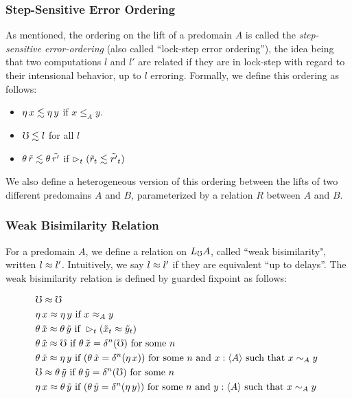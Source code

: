 \subsubsection{Step-Sensitive Error Ordering}\label{subsec:lock-step}

As mentioned, the ordering on the lift of a predomain $A$ is called the
\emph{step-sensitive error-ordering} (also called ``lock-step error ordering''),
the idea being that two computations $l$ and $l'$ are related if they are in
lock-step with regard to their intensional behavior, up to $l$ erroring.
Formally, we define this ordering as follows:

\begin{itemize}
  \item 	$\eta\, x \lesssim \eta\, y$ if $x \le_A y$.
  \item 	$\mho \lesssim l$ for all $l$ 
  \item   $\theta\, \tilde{r} \lesssim \theta\, \tilde{r'}$ if
          $\vartriangleright_t (\tilde{r}_t \lesssim \tilde{r'}_t)$
\end{itemize}

We also define a heterogeneous version of this ordering between the lifts of two
different predomains $A$ and $B$, parameterized by a relation $R$ between $A$ and $B$.

\subsubsection{Weak Bisimilarity Relation}

For a predomain $A$, we define a relation on $L_\mho A$, called ``weak bisimilarity",
written $l \approx l'$. Intuitively, we say $l \approx l'$ if they are equivalent
``up to delays''.
%
The weak bisimilarity relation is defined by guarded fixpoint as follows:

\begin{align*}
  &\mho \bisim \mho \\
%
  &\eta\, x \bisim \eta\, y \text{ if } 
    x \bisim_A y \\
%		
  &\theta\, \tilde{x} \bisim \theta\, \tilde{y} \text{ if } 
    \later_t (\tilde{x}_t \bisim \tilde{y}_t) \\
%	
  &\theta\, \tilde{x} \bisim \mho \text{ if } 
    \theta\, \tilde{x} = \delta^n(\mho) \text { for some $n$ } \\
%	
  &\theta\, \tilde{x} \bisim \eta\, y \text{ if }
    (\theta\, \tilde{x} = \delta^n(\eta\, x))
  \text { for some $n$ and $x : \ty{A}$ such that $x \sim_A y$ } \\
%
  &\mho \bisim \theta\, \tilde{y} \text { if } 
    \theta\, \tilde{y} = \delta^n(\mho) \text { for some $n$ } \\
%	
  &\eta\, x \bisim \theta\, \tilde{y} \text { if }
    (\theta\, \tilde{y} = \delta^n (\eta\, y))
  \text { for some $n$ and $y : \ty{A}$ such that $x \sim_A y$ }
\end{align*}

